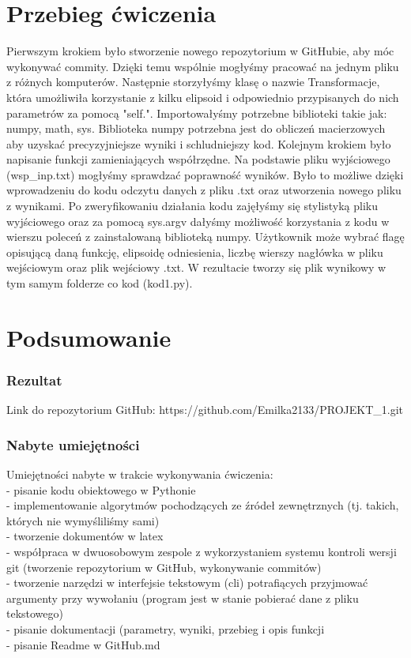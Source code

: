 \documentclass[11pt,a4paper]{article}
\begin{document}
\section {Przebieg ćwiczenia}
Pierwszym krokiem było stworzenie nowego repozytorium w GitHubie, aby móc wykonywać commity. Dzięki temu wspólnie mogłyśmy pracować na jednym pliku z różnych komputerów. Następnie storzyłyśmy klasę o nazwie Transformacje, która umożliwiła korzystanie z kilku elipsoid i odpowiednio przypisanych do nich parametrów za pomocą "self.". Importowałyśmy potrzebne biblioteki takie jak: numpy, math, sys. Biblioteka numpy  potrzebna jest do obliczeń macierzowych aby uzyskać precyzyjniejsze wyniki i schludniejszy kod. Kolejnym krokiem było napisanie funkcji zamieniających współrzędne. Na podstawie pliku wyjściowego (wsp\_inp.txt) mogłyśmy sprawdzać poprawność wyników. Było to możliwe dzięki wprowadzeniu do kodu odczytu danych z pliku .txt oraz utworzenia nowego pliku z wynikami. Po zweryfikowaniu działania kodu zajęłyśmy się stylistyką pliku wyjściowego oraz za pomocą sys.argv dałyśmy możliwość korzystania z kodu w wierszu poleceń z zainstalowaną biblioteką numpy. Użytkownik może wybrać flagę opisującą daną funkcję, elipsoidę odniesienia, liczbę wierszy nagłówka w pliku wejściowym oraz plik wejściowy .txt. W rezultacie tworzy się plik wynikowy w tym samym folderze co kod (kod1.py). 

\section {Podsumowanie}

\subsubsection{Rezultat}
Link do repozytorium GitHub: https://github.com/Emilka2133/PROJEKT\_1.git
\subsubsection{Nabyte umiejętności}
Umiejętności nabyte w trakcie wykonywania ćwiczenia:\\
 - pisanie kodu obiektowego w Pythonie\\
- implementowanie algorytmów pochodzących ze źródeł zewnętrznych (tj. takich, których nie wymyśliliśmy sami)\\
- tworzenie dokumentów w latex\\
- współpraca w dwuosobowym zespole z wykorzystaniem systemu kontroli wersji git (tworzenie repozytorium w GitHub, wykonywanie commitów)\\
- tworzenie narzędzi w interfejsie tekstowym (cli) potrafiących przyjmować argumenty przy wywołaniu (program jest w stanie pobierać dane z pliku tekstowego)\\
- pisanie dokumentacji (parametry, wyniki, przebieg i opis funkcji\\
- pisanie Readme w GitHub.md\\
\end{document}
